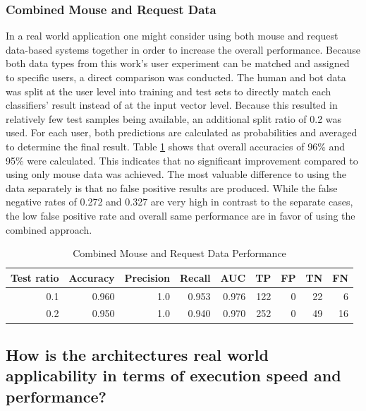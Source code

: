\documentclass[
    fontsize=12pt,
    headings=small,
    parskip=half,           %
    bibliography=totoc,
    numbers=noenddot,       %
    open=any,               %
    final,                   %
    table
]{scrreprt}
\begin{document}
\subsubsection{Combined Mouse and Request Data}

In a real world application one might consider using both mouse and request data-based systems together in order to increase the overall performance. Because both data types from this work's user experiment can be matched and assigned to specific users, a direct comparison was conducted. The human and bot data was split at the user level into training and test sets to directly match each classifiers' result instead of at the input vector level. Because this resulted in relatively few test samples being available, an additional split ratio of 0.2 was used. For each user, both predictions are calculated as probabilities and averaged to determine the final result. Table \ref{table:combined_performance} shows that overall accuracies of 96\% and 95\% were calculated. This indicates that no significant improvement compared to using only mouse data was achieved. The most valuable difference to using the data separately is that no false positive results are produced. While the false negative rates of 0.272 and 0.327 are very high in contrast to the separate cases, the low false positive rate and overall same performance are in favor of using the combined approach.

\begin{table}[H]
    \begin{center}
        \begin{tabular*}{\textwidth}{rrrrrrrrr @{\extracolsep{\fill}}}
            \toprule
            Test ratio & Accuracy & Precision & Recall & AUC & TP & FP & TN & FN \\
            \midrule
            0.1 & 0.960 & 1.0 & 0.953 & 0.976 & 122 & 0 & 22 & 6 \\
            0.2 & 0.950 & 1.0 & 0.940 & 0.970 & 252 & 0 & 49 & 16 \\
            \bottomrule
        \end{tabular*}
    \end{center}
    \caption{Combined Mouse and Request Data Performance}
    \label{table:combined_performance}
\end{table}

\subsection{How is the architectures real world applicability in terms of execution speed and performance?}
\end{document}
